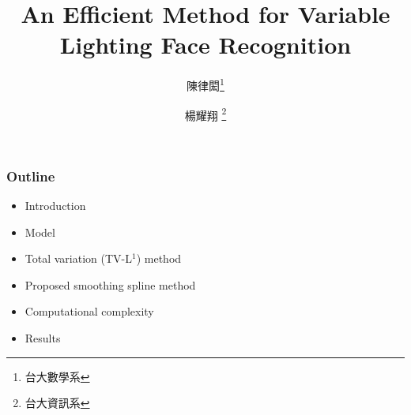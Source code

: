 \documentclass{beamer}
\begin{document}
\title{An Efficient Method for Variable Lighting Face Recognition}
\author{陳律閎\thanks{台大數學系}
\and
楊耀翔 \thanks{台大資訊系}}
\date{}

\maketitle

\begin{frame}
\frametitle{Outline}

\begin{itemize}

\item Introduction
\item Model
\item Total variation (TV-L$^{1}$) method
\item Proposed smoothing spline method
\item Computational complexity
\item Results

\end{itemize}
\end{frame}
\end{document}
